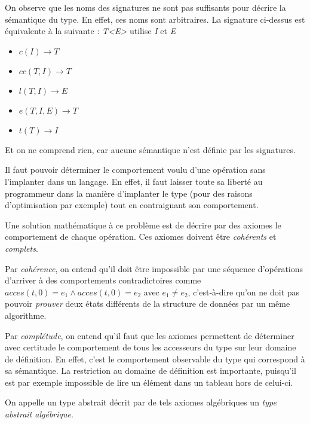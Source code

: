 \documentclass[../../../main.tex]{subfiles}
\begin{document}
On observe que les noms des signatures ne sont pas suffisants pour décrire la sémantique du type. En effet, ces noms sont arbitraires. La signature ci-dessus est équivalente à la suivante :
\textit{T\textless E\textgreater} utilise \textit{I} et \textit{E}
\begin{itemize}
	\item $c(I) \rightarrow T$
	\item $cc(T, I)\rightarrow T$
	\item $l(T, I) \rightarrow E$
	\item $e(T,I, E) \rightarrow T$
	\item $t(T)\rightarrow I$
\end{itemize}
Et on ne comprend rien, car aucune sémantique n'est définie par les signatures.

Il faut pouvoir déterminer le comportement voulu d'une opération sans l'implanter dans un langage. En effet, il faut laisser toute sa liberté au programmeur dans la manière d'implanter le type (pour des raisons d'optimisation par exemple) tout en contraignant son comportement.

Une solution mathématique à ce problème est de décrire par des axiomes le comportement de chaque opération. Ces axiomes doivent être \textit{cohérents} et \textit{complets}. 

Par \textit{cohérence}, on entend qu'il doit être impossible par une séquence d'opérations d'arriver à des comportements contradictoires comme $acces(t, 0) = e_1 \wedge acces(t, 0) = e_2$ avec $e_1 \neq e_2$, c'est-à-dire qu'on ne doit pas pouvoir \textit{prouver} deux états différents de la structure de données par un même algorithme. 

Par \textit{complétude}, on entend qu'il faut que les axiomes permettent de déterminer avec certitude le comportement de tous les accesseurs du type sur leur domaine de définition. En effet, c'est le comportement observable du type qui correspond à sa sémantique. La restriction au domaine de définition est importante, puisqu'il est par exemple impossible de lire un élément dans un tableau hors de celui-ci.

On appelle un type abstrait décrit par de tels axiomes algébriques un \textit{type abstrait algébrique}.
\end{document}
